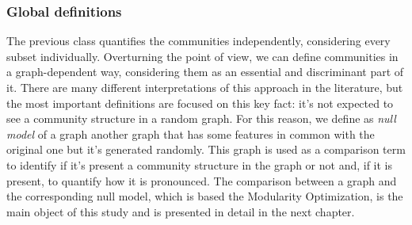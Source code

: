\subsubsection{Global definitions}
The previous class quantifies the communities independently, considering every subset individually. Overturning the point of view, we can define communities in a graph-dependent way, considering them as an essential and discriminant part of it. There are many different interpretations of this approach in the literature, but the most important definitions are focused on this key fact: it's not expected to see a community structure in a random graph. For this reason, we define as \textit{null model} of a graph another graph that has some features in common with the original one but it's generated randomly. This graph is used as a comparison term to identify if it's present a community structure in the graph or not and, if it is present, to quantify how it is pronounced.
The comparison between a graph and the corresponding null model, which is based the Modularity Optimization, is the main object of this study and is presented in detail in the next chapter.
